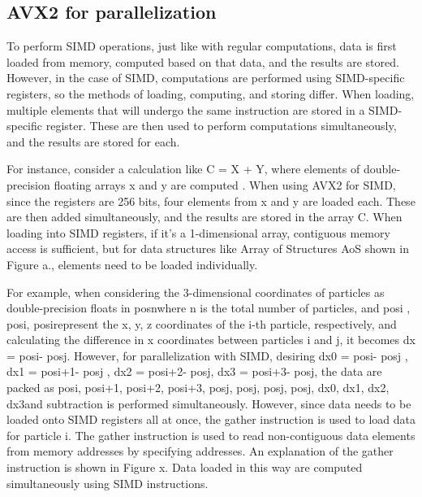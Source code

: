 \documentclass[ams, a4j]{U-AizuGT}
\begin{document}
\subsection{AVX2 for parallelization}
To perform SIMD operations, just like with regular computations, data is first loaded from memory, computed based on that data,
and the results are stored. However, in the case of SIMD, computations are performed using SIMD-specific registers, so the 
methods of loading, computing, and storing differ. When loading, multiple elements that will undergo the same instruction are
stored in a SIMD-specific register. These are then used to perform computations simultaneously, and the results are stored for
each. 


For instance, consider a calculation like C = X + Y, where elements of double-precision floating arrays x and y are computed
. When using AVX2 for SIMD, since the registers are 256 bits, four elements from x and y are loaded each. These are then added 
simultaneously, and the results are stored in the array C. When loading into SIMD registers, if it's a 1-dimensional array, 
contiguous memory access is sufficient, but for data structures like Array of Structures \lparen AoS \rparen shown in Figure a., elements need
to be loaded individually. 


For example, when considering the 3-dimensional coordinates of particles as double-precision floats 
in pos\lbrack n\rbrack {}\rbrack  \lparen where n is the total number of particles, and pos\lbrack i \rbrack {}\rbrack , pos\lbrack i\rbrack {}\rbrack , 
pos\lbrack i\rbrack {}\rbrack  represent the x, y, z coordinates 
of the i-th particle, respectively\rparen, and calculating the difference in x coordinates between particles i and j, it becomes dx = 
pos\lbrack i\rbrack {}\rbrack  - pos\lbrack j\rbrack {}\rbrack . However, for parallelization with SIMD, desiring dx0 = pos\lbrack i\rbrack {}\rbrack  - pos\lbrack j \rbrack {}\rbrack , dx1 = pos\lbrack i+1\rbrack {}\rbrack  - pos\lbrack j\rbrack {}\rbrack 
, dx2 = pos\lbrack i+2\rbrack {}\rbrack  - pos\lbrack j\rbrack {}\rbrack , dx3 = pos\lbrack i+3\rbrack {}\rbrack  - pos\lbrack j\rbrack {}\rbrack , 
the data are packed as \lparen pos\lbrack i\rbrack {}\rbrack , pos\lbrack i+1\rbrack {}\rbrack , pos\lbrack i+2\rbrack {}\rbrack , pos\lbrack  i+3\rbrack {}\rbrack \rparen,
\lparen pos\lbrack  j\rbrack {}\rbrack , pos\lbrack  j\rbrack {}\rbrack , pos\lbrack  j\rbrack {}\rbrack , pos\lbrack  j\rbrack {}\rparen, \lparen dx0, dx1, dx2, dx3\rparen and subtraction is performed simultaneously. However, since data needs
to be loaded onto SIMD registers all at once, the gather instruction is used to load data for particle i. The gather instruction is used
to read non-contiguous data elements from memory addresses by specifying addresses. An explanation of the gather instruction is shown in 
Figure x. Data loaded in this way are computed simultaneously using SIMD instructions. 
\end{document}
